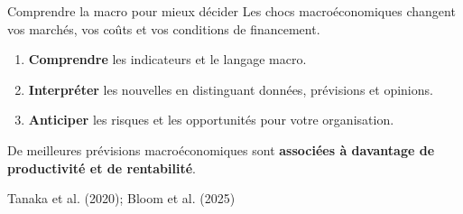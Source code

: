 \documentclass[aspectratio=169]{beamer}
\begin{document}
\begin{frame}{Comprendre la macro pour mieux décider}
   \RaggedRight Les chocs macroéconomiques changent vos marchés, vos coûts et vos conditions de financement.
   \par\vspace{0.25cm}
   \begin{enumerate}
      \setlength\itemsep{0.20cm}
      \item \textbf{Comprendre} les indicateurs et le langage macro.
      \item \textbf{Interpréter} les nouvelles en distinguant données, prévisions et opinions.
      \item \textbf{Anticiper} les risques et les opportunités pour votre organisation.
   \end{enumerate}
   \vspace{0.20cm}
   \begin{bizimplication}
      \RaggedRight\small De meilleures prévisions macroéconomiques sont \textbf{associées à davantage de productivité et de rentabilité}.
      \par\vspace{4pt}
      {\raggedleft\scriptsize\textcolor{HECgray}{Tanaka et al. (2020); Bloom et al. (2025)}\par}
   \end{bizimplication}
\end{frame}
\end{document}
